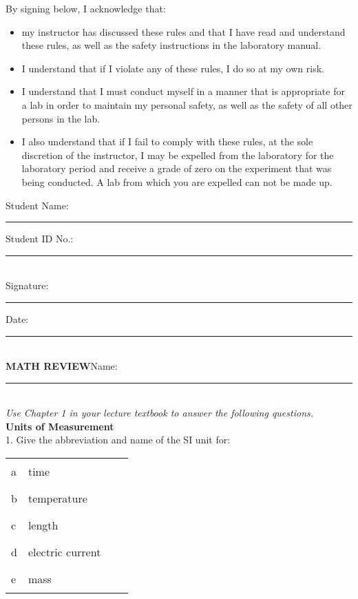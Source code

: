 \documentclass[12pt]{article}
\begin{document}
By signing below, I acknowledge that:
\begin{itemize}
  \item my instructor has discussed these rules and that I have read and understand these rules, as well as the safety instructions in the laboratory manual.
  \item I understand that if I violate any of these rules, I do so at my own risk. 
  \item I understand that I must conduct myself in a manner that is appropriate for a lab in order to maintain my personal safety, as well as the safety of all other persons in the lab.
  \item I also understand that if I fail to comply with these rules, at the sole discretion of the instructor, I may be expelled from the laboratory for the laboratory period and receive a grade of zero on the experiment that was being conducted. A lab from which you are expelled can not be made up. 
\end{itemize}
Student Name: \noindent\rule{4cm}{0.4pt} Student ID No.: \noindent\rule{3cm}{0.4pt}\\
Signature: \noindent\rule{5cm}{0.4pt} Date: \noindent\rule{4cm}{0.4pt}\\
{}
\newpage
\noindent\textbf{MATH REVIEW}\space\space\space\space\space Name: \rule{5cm}{0.4pt}\\
\noindent\makebox[\linewidth]{\rule{\paperwidth}{0.4pt}}
\emph{Use Chapter 1 in your lecture textbook to answer the following questions.}\\
\textbf{Units of Measurement}\\
\label{table:1}
\setlength{\linewidth}{3cm} 1. Give the abbreviation and name of the SI unit for:\\
\begin{tabular}{ l l l l } 
a & time & \noindent\rule{1cm}{0.4pt} & \noindent\rule{2cm}{0.4pt}\\ 
b & temperature & \noindent\rule{1cm}{0.4pt} & \noindent\rule{2cm}{0.4pt}\\ 
c & length & \noindent\rule{1cm}{0.4pt} & \noindent\rule{2cm}{0.4pt}\\
d & electric current & \noindent\rule{1cm}{0.4pt} & \noindent\rule{2cm}{0.4pt}\\ 
e & mass & \noindent\rule{1cm}{0.4pt} & \noindent\rule{2cm}{0.4pt}\\
\end{tabular}
\end{document}

